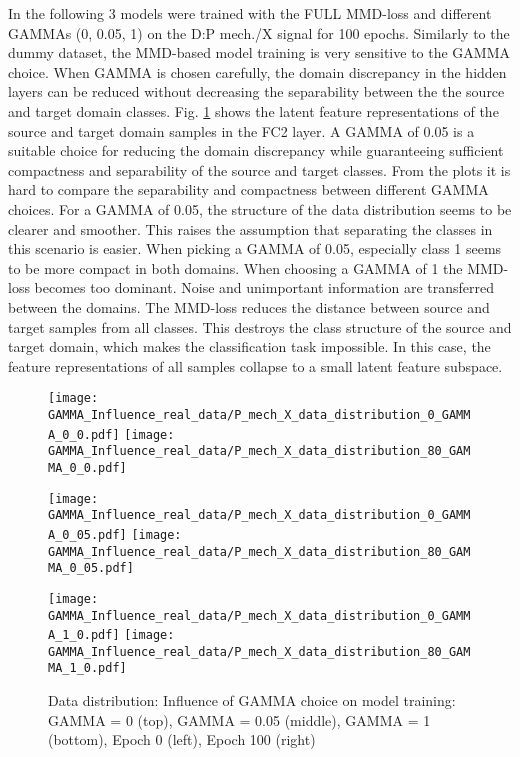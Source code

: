 In the following 3 models were trained with the FULL MMD-loss and different GAMMAs (0, 0.05, 1) on the  D:P mech./X signal for 100 epochs. Similarly to the dummy dataset, the MMD-based model training is very sensitive to the GAMMA choice. When GAMMA is chosen carefully, the domain discrepancy in the hidden layers can be reduced without decreasing the separability between the the source and target domain classes. Fig. \ref{fig:distribution_GAMMA_influence_real_data} shows the latent feature representations of the source and target domain samples in the FC2 layer. A GAMMA of 0.05 is a suitable choice for reducing the domain discrepancy while guaranteeing sufficient compactness and separability of the source and target classes. From the plots it is hard to compare the separability and compactness between different GAMMA choices. For a GAMMA of 0.05, the structure of the data distribution seems to be clearer and smoother. This raises the assumption that separating the classes in this scenario is easier. When picking a GAMMA of 0.05, especially class 1 seems to be more compact in both domains. When choosing a GAMMA of 1 the MMD-loss becomes too dominant. Noise and unimportant information are transferred between the domains. The MMD-loss reduces the distance between source and target samples from all classes. This destroys the class structure of the source and target domain, which makes the classification task impossible. In this case, the feature representations of all samples collapse to a small latent feature subspace.

\begin{figure}[H]
  \centering
  \texttt{[image: GAMMA\_Influence\_real\_data/P\_mech\_X\_data\_distribution\_0\_GAMMA\_0\_0.pdf]}
  \hspace{.4cm}
  \texttt{[image: GAMMA\_Influence\_real\_data/P\_mech\_X\_data\_distribution\_80\_GAMMA\_0\_0.pdf]}

  \vspace{.1cm}

  \texttt{[image: GAMMA\_Influence\_real\_data/P\_mech\_X\_data\_distribution\_0\_GAMMA\_0\_05.pdf]}
  \hspace{.4cm}
  \texttt{[image: GAMMA\_Influence\_real\_data/P\_mech\_X\_data\_distribution\_80\_GAMMA\_0\_05.pdf]}

  \vspace{.1cm}

  \texttt{[image: GAMMA\_Influence\_real\_data/P\_mech\_X\_data\_distribution\_0\_GAMMA\_1\_0.pdf]}
  \hspace{.4cm}
  \texttt{[image: GAMMA\_Influence\_real\_data/P\_mech\_X\_data\_distribution\_80\_GAMMA\_1\_0.pdf]}

  \vspace{.1cm}

  \caption{Data  distribution:  Influence of GAMMA choice on model training:  GAMMA  =  0  (top), GAMMA = 0.05 (middle), GAMMA = 1 (bottom), Epoch 0 (left), Epoch 100 (right)}
  \label{fig:distribution_GAMMA_influence_real_data}
\end{figure}


